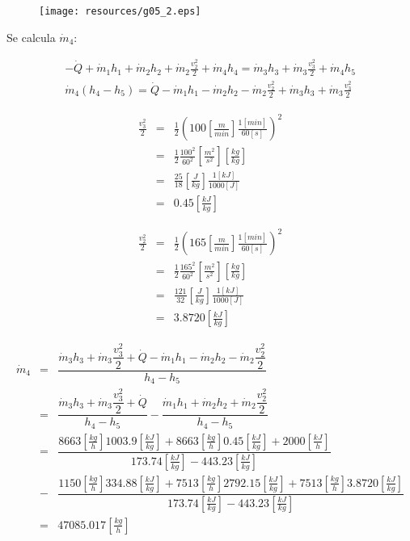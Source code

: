 \documentclass[letter,10pt]{article}
\begin{document}
\begin{enumerate}
\begin{figure}[H]
\centering
\texttt{[image: resources/g05\_2.eps]}
\end{figure}

Se calcula $\dot{m}_4$:

\begin{eqnarray*}
    -\dot{Q} + \dot{m}_1 h_1 + \dot{m}_2 h_2 + \dot{m}_2 \frac{v^2_2}{2}
    + \dot{m}_4 h_4
    = \dot{m}_3 h_3 + \dot{m}_3 \frac{v^2_3}{2} + \dot{m}_4 h_5 \\
    \dot{m}_4 (h_4 - h_5) = \dot{Q} - \dot{m}_1 h_1 - \dot{m}_2 h_2 
    - \dot{m}_2 \frac{v^2_2}{2} + \dot{m}_3 h_3 + \dot{m}_3 \frac{v^2_3}{2}
\end{eqnarray*}

\begin{eqnarray*}
    \frac{v^2_3}{2} &=& \frac{1}{2}\left(100[\frac{m}{min}]\frac{1[min]}{60[s]}\right)^2 \\
                    &=& \frac{1}{2}\frac{100^2}{60^2}[\frac{m^2}{s^2}][\frac{kg}{kg}] \\
                    &=& \frac{25}{18}[\frac{J}{kg}]\frac{1[kJ]}{1000[J]} \\
                    &=& 0.45[\frac{kJ}{kg}]
\end{eqnarray*}

\begin{eqnarray*}
    \frac{v^2_2}{2} &=& \frac{1}{2}\left(165[\frac{m}{min}]\frac{1[min]}{60[s]}\right)^2 \\
                    &=& \frac{1}{2}\frac{165^2}{60^2}[\frac{m^2}{s^2}][\frac{kg}{kg}] \\
                    &=& \frac{121}{32}[\frac{J}{kg}]\frac{1[kJ]}{1000[J]} \\
                    &=& 3.8720[\frac{kJ}{kg}]
\end{eqnarray*}

\begin{eqnarray*}
    \dot{m}_4 &=& \dfrac{\dot{m}_3 h_3 + \dot{m}_3 \dfrac{v^2_3}{2} + \dot{Q} - \dot{m}_1 h_1 - \dot{m}_2 h_2 - \dot{m}_2 \dfrac{v^2_2}{2}}{h_4 - h_5} \\
              &=& \dfrac{\dot{m}_3 h_3 + \dot{m}_3 \dfrac{v^2_3}{2} + \dot{Q}}{h_4 - h_5} - \dfrac{\dot{m}_1 h_1 + \dot{m}_2 h_2 + \dot{m}_2 \dfrac{v^2_2}{2}}{h_4 - h_5} \\
              &=& \dfrac{8663[\frac{kg}{h}]1003.9[\frac{kJ}{kg}] + 8663[\frac{kg}{h}] 0.45[\frac{kJ}{kg}] + 2000[\frac{kJ}{h}]}{173.74[\frac{kJ}{kg}]-443.23[\frac{kJ}{kg}]} \\
              &-& \dfrac{1150[\frac{kg}{h}] 334.88[\frac{kJ}{kg}] + 7513[\frac{kg}{h}] 2792.15[\frac{kJ}{kg}] + 7513[\frac{kg}{h}] 3.8720[\frac{kJ}{kg}]}{173.74[\frac{kJ}{kg}]-443.23[\frac{kJ}{kg}]} \\
              &=& 47085.017[\frac{kg}{h}]
\end{eqnarray*}


\end{enumerate}
\end{document}
